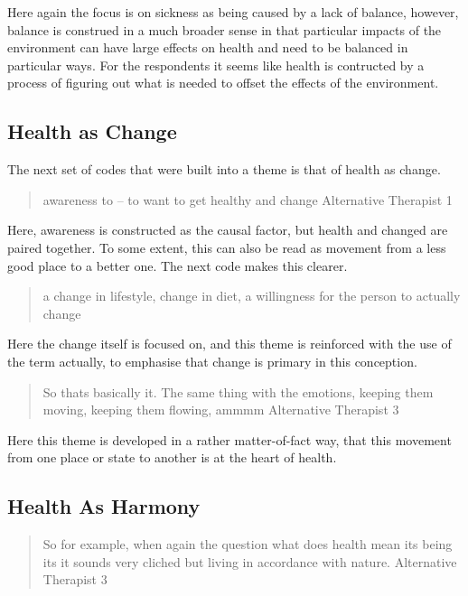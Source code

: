 Here again the focus is on sickness as being caused by a lack of balance, however, balance is construed in a much broader sense in that particular impacts of the environment can have large effects on health and need to be balanced in particular ways. For the respondents it seems like health is contructed by a process of figuring out what is needed to offset the effects of the environment. 


\subsection{Health as Change}
\label{sec:health-as-change}

The next set of codes that were built into a theme is that of health as change. 

\begin{quotation}
  awareness to – to want to get healthy and change 
  Alternative Therapist 1
\end{quotation}

Here, awareness is constructed as the causal factor, but health and changed are paired together. To some extent, this can also be read as movement from a less good place to a better one. 
The next code makes this clearer.

\begin{quotation}
  a change in lifestyle, change in diet, a willingness for the person to actually change 

\end{quotation}

Here the change itself is focused on, and this theme is reinforced with the use of the term actually, to emphasise that change is primary in this conception. 

\begin{quotation}
  So thats basically it. The same thing with the emotions, keeping them moving, keeping them flowing, ammmm 
Alternative Therapist 3
\end{quotation}

Here this theme is developed in a rather matter-of-fact way, that this movement from one place or state to another is at the heart of health. 

\subsection{Health As Harmony}
\label{sec:health-as-harmony}

\begin{quotation}
   So for example, when again the question what does health mean its being its it sounds very cliched but living in accordance with nature.
Alternative Therapist 3
\end{quotation}

